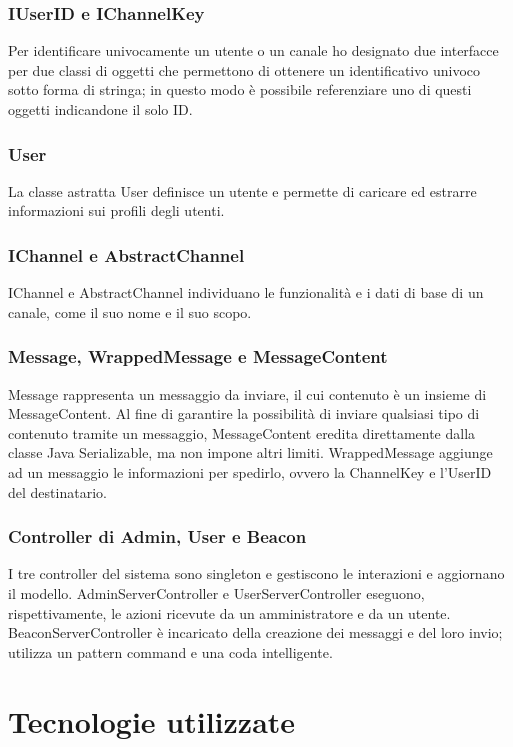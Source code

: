 		\subsubsection{IUserID e IChannelKey}
	Per identificare univocamente un utente o un canale ho designato due interfacce per due classi di oggetti che permettono di ottenere un identificativo univoco sotto forma di stringa; in questo modo è possibile referenziare uno di questi oggetti indicandone il solo ID.\@

		\subsubsection{User}
	La classe astratta User definisce un utente e permette di caricare ed estrarre informazioni sui profili degli utenti.

		\subsubsection{IChannel e AbstractChannel}
	IChannel e AbstractChannel individuano le funzionalità e i dati di base di un canale, come il suo nome e il suo scopo.

		\subsubsection{Message, WrappedMessage e MessageContent}
	Message rappresenta un messaggio da inviare, il cui contenuto è un insieme di MessageContent. Al fine di garantire la possibilità di inviare qualsiasi tipo di contenuto tramite un messaggio, MessageContent eredita direttamente dalla classe Java Serializable, ma non impone altri limiti. WrappedMessage aggiunge ad un messaggio le informazioni per spedirlo, ovvero la ChannelKey e l'UserID del destinatario.

		\subsubsection{Controller di Admin, User e Beacon}
	I tre controller del sistema sono singleton e gestiscono le interazioni e aggiornano il modello. AdminServerController e UserServerController eseguono, rispettivamente, le azioni ricevute da un amministratore e da un utente. BeaconServerController è incaricato della creazione dei messaggi e del loro invio; utilizza un pattern command e una coda intelligente.

\section{Tecnologie utilizzate}
